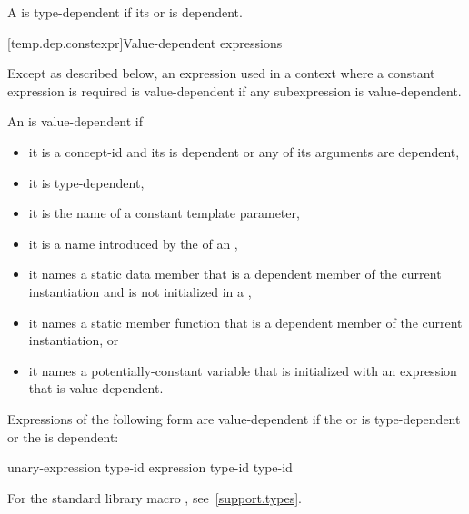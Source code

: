 \pnum
A  is type-dependent
if its  or
is dependent.

[temp.dep.constexpr]{Value-dependent expressions}

\pnum
Except as described below, an expression used in a context where a
constant expression is required is value-dependent if any
subexpression is value-dependent.

\pnum
An
is value-dependent if
\begin{itemize}
\item
it is a concept-id and
its  is dependent or
any of its arguments are dependent,
\item
it is type-dependent,
\item
it is the name of a constant template parameter,
\item
it is a name introduced by the 
of an ,
\item
it names a static data member that is a dependent member of the current
instantiation and is not initialized in a ,
\item
it names a static member function that is a dependent member of the current
instantiation, or
\item
it names a potentially-constant variable
that is initialized with an expression that is value-dependent.
\end{itemize}

Expressions of the following form are value-dependent if the
 or 
is type-dependent or the
is dependent:

\begin{ncsimplebnf}
 unary-expression\br
{} \terminal{(} type-id \terminal{)}\br
{} \terminal{(} expression \terminal{)}\br
{} \terminal{(} type-id \terminal{)}\br
{} \terminal{(} type-id \terminal{)}
\end{ncsimplebnf}

\begin{note}
For the standard library macro ,
see~\ref{support.types}.
\end{note}

